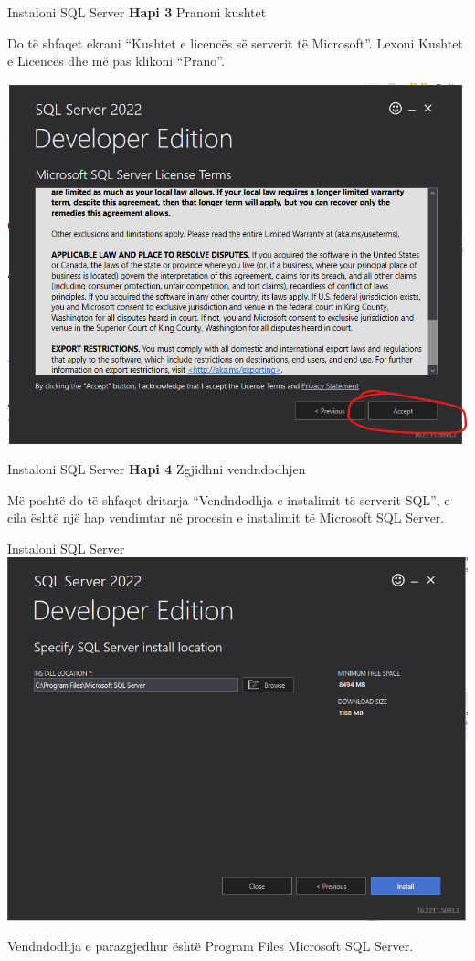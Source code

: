 \documentclass[
  ignorenonframetext,
]{beamer}
\begin{document}
\begin{frame}{Instaloni SQL Server}
\label{instaloni-sql-server-2}
\textbf{Hapi 3} Pranoni kushtet

Do të shfaqet ekrani ``Kushtet e licencës së serverit të Microsoft''.
Lexoni Kushtet e Licencës dhe më pas klikoni ``Prano''.

\includegraphics{./Figs/install3.png}
\end{frame}

\begin{frame}{Instaloni SQL Server}
\label{instaloni-sql-server-3}
\textbf{Hapi 4} Zgjidhni vendndodhjen

Më poshtë do të shfaqet dritarja ``Vendndodhja e instalimit të serverit
SQL'', e cila është një hap vendimtar në procesin e instalimit të
Microsoft SQL Server.
\end{frame}

\begin{frame}{Instaloni SQL Server}
\label{instaloni-sql-server-4}
\includegraphics{./Figs/install4.png}

Vendndodhja e parazgjedhur është Program Files Microsoft SQL Server.
\end{frame}
\end{document}
